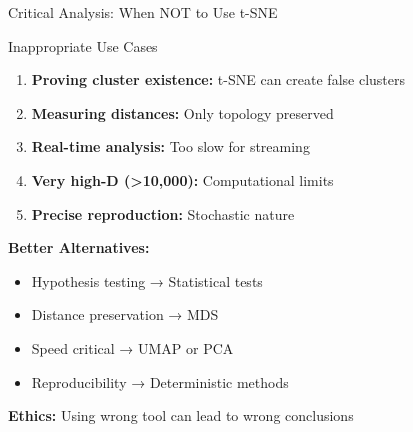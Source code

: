 \documentclass[aspectratio=169]{beamer}
\newcommand{\ethics}[1]{\colorbox{purple!10}{\textcolor{ethicscolor}{\textbf{Ethics:} #1}}}
\begin{document}
\begin{frame}{Critical Analysis: When NOT to Use t-SNE}
\begin{block}{Inappropriate Use Cases}
\begin{enumerate}
\item \textbf{Proving cluster existence:} t-SNE can create false clusters
\item \textbf{Measuring distances:} Only topology preserved
\item \textbf{Real-time analysis:} Too slow for streaming
\item \textbf{Very high-D (>10,000):} Computational limits
\item \textbf{Precise reproduction:} Stochastic nature
\end{enumerate}
\end{block}

\textbf{Better Alternatives:}
\begin{itemize}
\item Hypothesis testing → Statistical tests
\item Distance preservation → MDS
\item Speed critical → UMAP or PCA
\item Reproducibility → Deterministic methods
\end{itemize}

\ethics{Using wrong tool can lead to wrong conclusions}
\end{frame}
\end{document}
